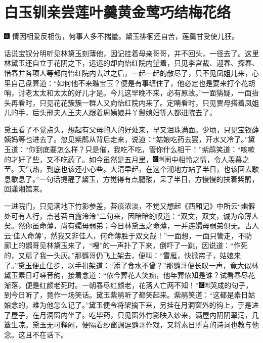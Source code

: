 

\chapter{白玉钏亲尝莲叶羹\hspace{.5em}黄金莺巧结梅花络}

{\includegraphics[width=3mm]{../Images/00005}  \kaishu 情因相爱反相伤，何事人多不揣量。黛玉徘徊还自苦，莲羹甘受使儿狂。}

话说宝钗分明听见林黛玉刻薄他，因记挂着母亲哥哥，并不回头，一径去了。这里林黛玉还自立于花阴之下，远远的却向怡红院内望着，只见李宫裁、迎春、探春、惜春并各项人等都向怡红院内去过之后，一起一起的散尽了，只不见凤姐儿来，心里自己盘算道：“如何他不来瞧宝玉？便是有事缠住了，他必定也是要来打个花胡哨，讨老太太和太太的好儿才是。今儿这早晚不来，必有原故。”一面猜疑，一面抬头再看时，只见花花簇簇一群人又向怡红院内来了。定睛看时，只见贾母搭着凤姐儿的手，后头邢夫人王夫人跟着周姨娘并丫鬟媳妇等人都进院去了。

黛玉看了不觉点头，想起有父母的人的好处来，早又泪珠满面。少顷，只见宝钗薛姨妈等也进去了。忽见紫鹃从背后走来，说道：“姑娘吃药去罢，开水又冷了。”黛玉道：“你到底要怎么样？只是催，我吃不吃，管你什么相干！”紫鹃笑道：“咳嗽的才好了些，又不吃药了。如今虽然是五月里，{\includegraphics[width=3mm]{../Images/00006}\includegraphics[width=3mm]{../Images/00011}\footnotesize \kaishu 闺中相怜之情，令人羡慕之至。}天气热，到底也该还小心些。大清早起，在这个潮地方站了半日，也该回去歇息歇息了。”一句话提醒了黛玉，方觉得有点腿酸，呆了半日，方慢慢的扶着紫鹃，回潇湘馆来。

一进院门，只见满地下竹影参差，苔痕浓淡，不觉又想起《西厢记》中所云“幽僻处可有人行，点苍苔白露泠泠”二句来，因暗暗的叹道：“双文，双文，诚为命薄人矣。然你虽命薄，尚有孀母弱弟；今日林黛玉之命薄，一并连孀母弱弟俱无。古人云‘佳人命薄’，然我又非佳人，何命薄胜于双文哉！”一面想，一面只管走，不防廊上的鹦哥见林黛玉来了，“嘎”的一声扑了下来，倒吓了一跳，因说道：“作死的，又扇了我一头灰。”那鹦哥仍飞上架去，便叫：“雪雁，快掀帘子，姑娘来了。”黛玉便止住步，以手扣架道：“添了食水不曾？”那鹦哥便长叹一声，竟大似林黛玉素日吁嗟音韵，接着念道：“侬今葬花人笑痴，他年葬侬知是谁？试看春尽花渐落，便是红颜老死时。一朝春尽红颜老，花落人亡两不知！”{\includegraphics[width=3mm]{../Images/00006}\includegraphics[width=3mm]{../Images/00011}\footnotesize \kaishu 哭成的句子，到今日听了，竟作一场笑话。}黛玉紫鹃听了都笑起来。紫鹃笑道：“这都是素日姑娘念的，难为他怎么记了。”黛玉便令将架摘下来，另挂在月洞窗外的钩上，于是进了屋子，在月洞窗内坐了。吃毕药，只见窗外竹影映入纱来，满屋内阴阴翠润，几簟生凉。黛玉无可释闷，便隔着纱窗调逗鹦哥作戏，又将素日所喜的诗词也教与他念。这且不在话下。

